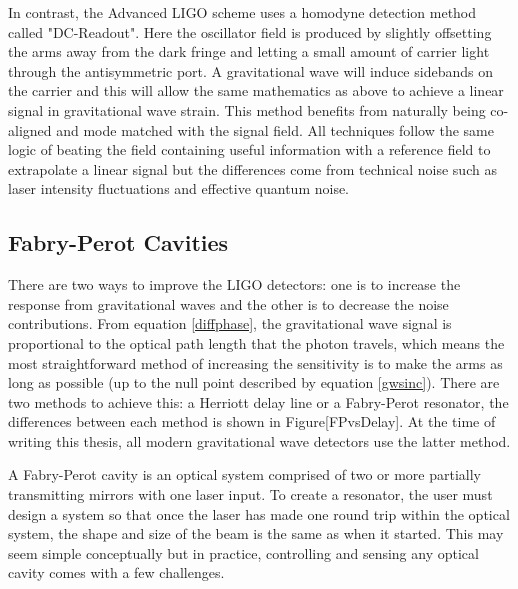 		In contrast, the Advanced LIGO scheme uses a homodyne detection \cite{HildDCReadout} method called "DC-Readout".  Here the oscillator field is produced by slightly offsetting the arms away from the dark fringe and letting a small amount of carrier light through the antisymmetric port.  A gravitational wave will induce sidebands on the carrier and this will allow the same mathematics as above to achieve a linear signal in gravitational wave strain. This method benefits from naturally being co-aligned and mode matched with the signal field.  All techniques follow the same logic of beating the field containing useful information with a reference field to extrapolate a linear signal but the differences come from technical noise such as laser intensity fluctuations and effective quantum noise.
		
		\cite{BlackPDH}	
	
		\subsection{Fabry-Perot Cavities}\label{FP}
		There are two ways to improve the LIGO detectors: one is to increase the response from gravitational waves and the other is to decrease the noise contributions. From equation \ref{diffphase}, the gravitational wave signal is proportional to the optical path length that the photon travels, which means the most straightforward method of increasing the sensitivity is to make the arms as long as possible (up to the null point described by equation \ref{gwsinc}).  There are two methods to achieve this: a Herriott delay line or a Fabry-Perot resonator, the differences between each method is shown in Figure[FPvsDelay].  At the time of writing this thesis, all modern gravitational wave detectors use the latter method.
	
		A Fabry-Perot cavity is an optical system comprised of two or more partially transmitting mirrors with one laser input.  To create a resonator, the user must design a system so that once the laser has made one round trip within the optical system, the shape and size of the beam is the same as when it started.  This may seem simple conceptually but in practice, controlling and sensing any optical cavity comes with a few challenges.
		
